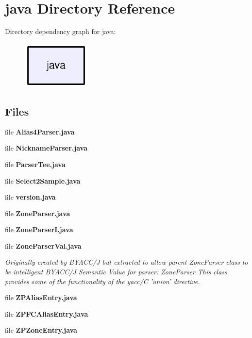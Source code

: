 \section{java Directory Reference}
\label{dir_93c6ba7fb77bae0709fae89c9c13b44a}
Directory dependency graph for java\-:\nopagebreak
\begin{figure}[H]
\begin{center}
\leavevmode
\includegraphics[width=98pt]{dir_93c6ba7fb77bae0709fae89c9c13b44a_dep}
\end{center}
\end{figure}
\subsection*{Files}
\begin{DoxyCompactItemize}
\item 
file {\bf Alias4\-Parser.\-java}
\item 
file {\bf Nickname\-Parser.\-java}
\item 
file {\bf Parser\-Tee.\-java}
\item 
file {\bf Select2\-Sample.\-java}
\item 
file {\bf version.\-java}
\item 
file {\bf Zone\-Parser.\-java}
\item 
file {\bf Zone\-Parser\-I.\-java}
\item 
file {\bf Zone\-Parser\-Val.\-java}
\begin{DoxyCompactList}\small\item\em Originally created by B\-Y\-A\-C\-C/\-J but extracted to allow parent Zone\-Parser class to be intelligent B\-Y\-A\-C\-C/\-J Semantic Value for parser\-: Zone\-Parser This class provides some of the functionality of the yacc/\-C 'union' directive. \end{DoxyCompactList}\item 
file {\bf Z\-P\-Alias\-Entry.\-java}
\item 
file {\bf Z\-P\-F\-C\-Alias\-Entry.\-java}
\item 
file {\bf Z\-P\-Zone\-Entry.\-java}
\end{DoxyCompactItemize}
